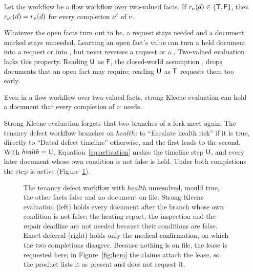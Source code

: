 \begin{proposition}
\label{prop:sound}
Let the workflow be a flow workflow over two-valued facts. If $r_\nu(d)\in\{\mathsf{T},\mathsf{F}\}$, then $r_{\nu'}(d)=r_\nu(d)$ for every completion $\nu'$ of $\nu$.
\end{proposition}

Whatever the open facts turn out to be, a request stays needed and a document marked \skipd stays unneeded. Learning an open fact's value can turn a held document into a request or into \skipd, but never reverses a request or a \skipd. Two-valued evaluation lacks this property. Reading $\mathsf{U}$ as $\mathsf{F}$, the closed-world assumption \cite{reiter1978closed}, drops documents that an open fact may require; reading $\mathsf{U}$ as $\mathsf{T}$ requests them too early.

\begin{proposition}
\label{prop:incomplete}
Even in a flow workflow over two-valued facts, strong Kleene evaluation can hold a document that every completion of $\nu$ needs.
\end{proposition}

Strong Kleene evaluation forgets that two branches of a fork meet again. The tenancy defect workflow branches on $\mathit{health}$: to ``Escalate health risk'' if it is true, directly to ``Dated defect timeline'' otherwise, and the first leads to the second. With $\mathit{health}=\mathsf{U}$, Equation~\eqref{eq:activation} makes the timeline step $\mathsf{U}$, and every later document whose own condition is not false is held. Under both completions the step is active (Figure~\ref{fig:reconverge}).

\begin{figure}[t]
\centering
{}
\caption{The tenancy defect workflow with $\mathit{health}$ unresolved, mould true, the other facts false and no document on file. Strong Kleene evaluation (left) holds every document after the branch whose own condition is not false; the heating report, the inspection and the repair deadline are not needed because their conditions are false. Exact deferral (right) holds only the medical confirmation, on which the two completions disagree. Because nothing is on file, the lease is requested here; in Figure~\ref{fig:hero} the claims attach the lease, so the product lists it as present and does not request it.}
\label{fig:reconverge}
\end{figure}

